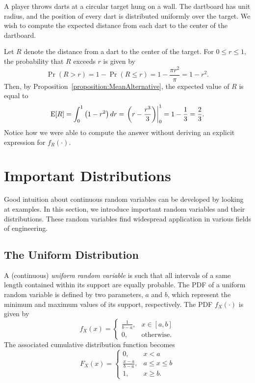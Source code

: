 \begin{example}
A player throws darts at a circular target hung on a wall.
The dartboard has unit radius, and the position of every dart is distributed uniformly over the target.
We wish to compute the expected distance from each dart to the center of the dartboard.

Let $R$ denote the distance from a dart to the center of the target.
For $0 \leq r \leq 1$, the probability that $R$ exceeds $r$ is given by
\begin{equation*}
\Pr (R > r) = 1 - \Pr (R \leq r) = 1 - \frac{\pi r^2}{\pi} = 1 - r^2 .
\end{equation*}
Then, by Proposition~\ref{proposition:MeanAlternative}, the expected value of $R$ is equal to
\begin{equation*}
\mathrm{E} [R] = \int_0^1 \left( 1 - r^2 \right) dr
= \left.  \left( r - \frac{r^3}{3} \right) \right|_0^1
= 1 - \frac{1}{3} = \frac{2}{3} .
\end{equation*}
Notice how we were able to compute the answer without deriving an explicit expression for $f_R (\cdot)$.
\end{example}


\section{Important Distributions}

Good intuition about continuous random variables can be developed by looking at examples.
In this section, we introduce important random variables and their distributions.
These random variables find widespread application in various fields of engineering.


\subsection{The Uniform Distribution}

A (continuous) \emph{uniform random variable} is such that all intervals of a same length contained within its support are equally probable. 
The PDF of a uniform random variable is defined by two parameters, $a$ and $b$, which represent the minimum and maximum values of its support, respectively.
The PDF $f_X(\cdot)$ is given by
\begin{equation*}
f_X(x) = \begin{cases} \frac{1}{b-a}, & x \in [a, b] \\
0, & \text{otherwise}. \end{cases}
\end{equation*}
The associated cumulative distribution function becomes
\begin{equation*}
F_X(x) = \begin{cases} 0, & x < a \\
\frac{x-a}{b-a}, & a \leq x \leq b \\
1, & x \geq b . \end{cases}
\end{equation*}

